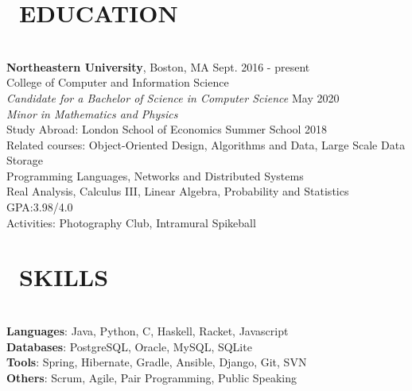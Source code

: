 \documentclass[11pt]{res}
\newcommand{\sectionunderline}{\vspace{-3mm}\hrulefill\\}
\newcommand{\listingtab}{\tabto{3.5cm}}
\newcommand{\newsect}[1]{\section{\Large \bf #1}}
\newcommand{\email}[1]{\faEnvelope\hspace{1mm} \href{mailto:#1}{#1}}
\newcommand{\phone}[1]{\faMobilePhone\hspace{1mm} #1}
\newcommand{\github}[1]{\faGithubSquare\hspace{1mm} \href{https://github.com/#1}{#1}}
\newcommand{\linkedin}[1]{\faLinkedinSquare\hspace{1mm} \href{https://linkedin.com/in/#1}{#1}}
\begin{document}
\address{
  \small\phone{(802) 503-5089}\:
  \large{$\bullet$}
  \small\email{derekpham67@gmail.com}\:
  \large{$\bullet$}
  \small\github{derekpham}\:
  \large{$\bullet$}
  \small\linkedin{derek-pham97}\\
  \small Available: January - August 2019
}

\begin{resume}
  \newsect{\faGraduationCap\ EDUCATION}{
    \sectionunderline{
      {\bf \large Northeastern University}, Boston, MA \hfill Sept. 2016 - present\\
      College of Computer and Information Science}\\
                     {\it Candidate for a Bachelor of Science in Computer Science} \hfill May 2020\\
                     {\it Minor in Mathematics and Physics}\vspace{2mm}\\
                     Study Abroad: \listingtab London School of Economics Summer School \hfill 2018\\
                     Related courses:
                     \listingtab Object-Oriented Design, Algorithms and Data, Large Scale Data Storage\\
                     \listingtab Programming Languages, Networks and Distributed Systems\\
                     \listingtab Real Analysis, Calculus III, Linear Algebra, Probability and Statistics\\
                     GPA:\listingtab 3.98/4.0\\
                     Activities: \listingtab Photography Club, Intramural Spikeball
  }

  \newsect{\faCogs\ SKILLS}{
    \sectionunderline{
      {\bf Languages}: \listingtab Java, Python, C, Haskell, Racket, Javascript\\
      {\bf Databases}: \listingtab PostgreSQL, Oracle, MySQL, SQLite\\
      {\bf Tools}: \listingtab Spring, Hibernate, Gradle, Ansible, Django, Git, SVN\\
      {\bf Others}: \listingtab Scrum, Agile, Pair Programming, Public Speaking
    }
  }


\end{resume}
\end{document}
